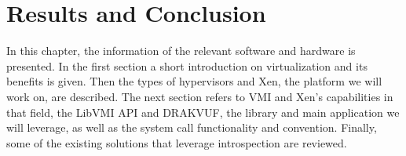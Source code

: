 
\chapter{Results and Conclusion}\label{ch:chapter4}

In this chapter, the information of the relevant software and hardware is presented. In the first section a short introduction on virtualization and its benefits is given. Then the types of hypervisors and Xen, the platform we will work on, are described. The next section refers to \ac{VMI} and Xen's capabilities in that field, the LibVMI \ac{API} and DRAKVUF, the library and main application we will leverage, as well as the system call functionality and convention. Finally, some of the existing solutions that leverage introspection are reviewed.

